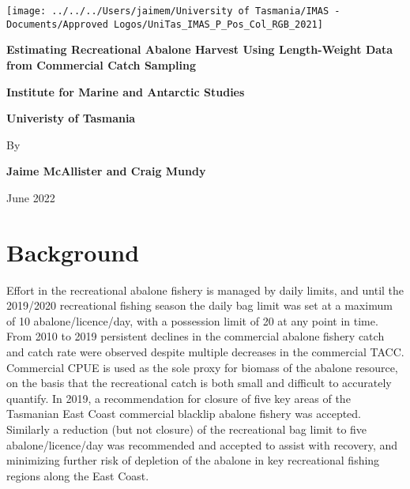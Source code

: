 \documentclass[
  11pt,
]{article}
\author{}
\date{\vspace{-2.5em}}
\begin{document}
\subsectionfont{\raggedright}
\subsubsectionfont{\raggedright}


\begin{centering}

\vspace{3cm}


\begin{center}\texttt{[image: ../../../Users/jaimem/University of Tasmania/IMAS - Documents/Approved Logos/UniTas\_IMAS\_P\_Pos\_Col\_RGB\_2021]} \end{center}

\vspace{4cm}

\LARGE

\doublespacing
{\bf Estimating Recreational Abalone Harvest Using Length-Weight Data from Commercial Catch Sampling}

\vspace{4 cm}

\Large
{\bf Institute for Marine and Antarctic Studies}

\Large
{\bf Univeristy of Tasmania}

\vspace{1cm}

\normalsize
\singlespacing
By

\vspace{0.5 cm}

\large

{\bf Jaime McAllister and Craig Mundy}

\vspace{1.5 cm}

\normalsize
June 2022

\end{centering}

\newpage

\section{Background}\label{background}

Effort in the recreational abalone fishery is managed by daily limits,
and until the 2019/2020 recreational fishing season the daily bag limit
was set at a maximum of 10 abalone/licence/day, with a possession limit
of 20 at any point in time. From 2010 to 2019 persistent declines in the
commercial abalone fishery catch and catch rate were observed despite
multiple decreases in the commercial TACC. Commercial CPUE is used as
the sole proxy for biomass of the abalone resource, on the basis that
the recreational catch is both small and difficult to accurately
quantify. In 2019, a recommendation for closure of five key areas of the
Tasmanian East Coast commercial blacklip abalone fishery was accepted.
Similarly a reduction (but not closure) of the recreational bag limit to
five abalone/licence/day was recommended and accepted to assist with
recovery, and minimizing further risk of depletion of the abalone in key
recreational fishing regions along the East Coast.
\end{document}
